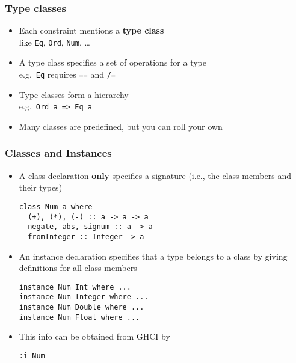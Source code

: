 \documentclass{beamer}
\begin{document}
\begin{frame}[fragile]
  \frametitle{Type classes}
  \begin{itemize}
  \item Each constraint mentions a \textbf{type class}\\
    like \texttt{Eq}, \texttt{Ord}, \texttt{Num}, \dots
  \item A type class specifies a set of operations for a type\\
    e.g.\ \texttt{Eq} requires \texttt{==} and \texttt{/=}
  \item Type classes form a hierarchy\\
    e.g.\ \texttt{Ord a => Eq a}
  \item Many classes are predefined, but you can roll your own
  \end{itemize}
\end{frame}
\begin{frame}[fragile]
  \frametitle{Classes and Instances}
  \begin{itemize}
  \item A class declaration \textbf{only} specifies a signature (i.e., the class members and their types)
\begin{verbatim}
class Num a where
  (+), (*), (-) :: a -> a -> a
  negate, abs, signum :: a -> a
  fromInteger :: Integer -> a
\end{verbatim}
  \item An instance declaration specifies that a type belongs to a class by giving definitions for all class members
\begin{verbatim}
instance Num Int where ...
instance Num Integer where ...
instance Num Double where ...
instance Num Float where ...
\end{verbatim}
  \item This info can be obtained from GHCI by
\begin{verbatim}
:i Num 
\end{verbatim}
  \end{itemize}
\end{frame}
\end{document}
